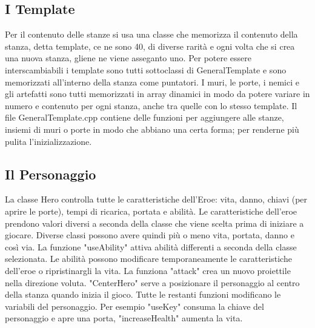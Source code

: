 \documentclass[12pt]{article}
\begin{document}
\subsection{I Template}
Per il contenuto delle stanze si usa una classe che memorizza il contenuto della stanza, detta template, ce ne sono 40,
 di diverse rarità e ogni volta che si crea una nuova stanza, gliene ne viene asseganto uno. \hfill\break
Per potere essere interscambiabili i template sono tutti sottoclassi di GeneralTemplate e sono memorizzati all'interno
 della stanza come puntatori. \hfill\break
I muri, le porte, i nemici e gli artefatti sono tutti memorizzati in array dinamici in modo da potere variare in numero
 e contenuto per ogni stanza, anche tra quelle con lo stesso template.  \hfill\break
Il file GeneralTemplate.cpp contiene delle funzioni per aggiungere alle stanze, insiemi di muri o porte in modo che abbiano
 una certa forma; per renderne più pulita l'inizializzazione.

\subsection{Il Personaggio}
La classe Hero controlla tutte le caratteristiche dell'Eroe: vita, danno, chiavi (per aprire le porte), tempi di ricarica, portata e abilità.
Le caratteristiche dell'eroe prendono valori diversi a seconda della classe che viene scelta prima di iniziare a giocare. Diverse
 classi possono avere quindi più o meno vita, portata, danno e così via.
La funzione "useAbility" attiva abilità differenti a seconda della classe selezionata.
Le abilità possono modificare temporaneamente le caratteristiche dell'eroe o ripristinargli la vita.
La funziona "attack" crea un nuovo proiettile nella direzione voluta. "CenterHero" serve a posizionare il personaggio al centro
 della stanza quando inizia il gioco. 
Tutte le restanti funzioni modificano le variabili del personaggio. Per esempio "useKey" consuma la chiave del personaggio e apre
 una porta, "increaseHealth" aumenta la vita.
\end{document}
